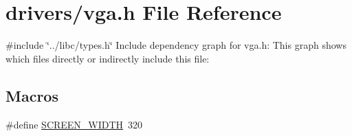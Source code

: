 \hypertarget{a00038}{}\section{drivers/vga.h File Reference}
\label{a00038}
{\ttfamily \#include \char`\"{}../libc/types.\+h\char`\"{}}\newline
Include dependency graph for vga.\+h\+:
This graph shows which files directly or indirectly include this file\+:
\subsection*{Macros}
\begin{DoxyCompactItemize}
\item 
\#define \hyperlink{a00038_a2cd109632a6dcccaa80b43561b1ab700_a2cd109632a6dcccaa80b43561b1ab700}{S\+C\+R\+E\+E\+N\+\_\+\+W\+I\+D\+TH}~320
\end{DoxyCompactItemize}
